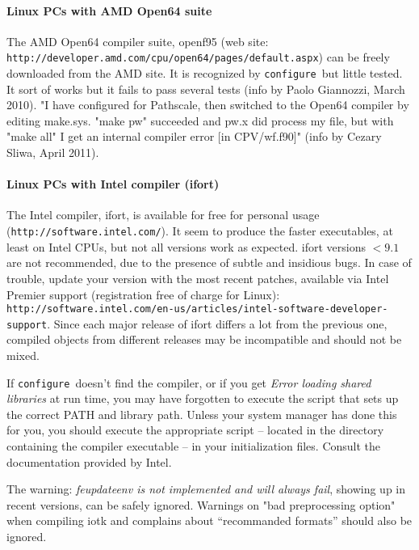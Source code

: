 \documentclass[12pt,a4paper]{article}
\def\configure{\texttt{configure}}
\begin{document}
\paragraph{Linux PCs with AMD Open64 suite}

The AMD Open64 compiler suite, openf95 (web site:
\texttt{http://developer.amd.com/cpu/open64/pages/default.aspx})
can be freely downloaded from the AMD site.
It is recognized by \configure\ but little tested. It sort of works 
but it fails to pass several tests (info by Paolo Giannozzi, March 2010).
"I have configured for Pathscale, then switched to the Open64 compiler by 
editing make.sys. "make pw" succeeded and pw.x did process my file, but with 
"make all" I get an internal compiler error [in CPV/wf.f90]" (info by Cezary 
Sliwa, April 2011).

\paragraph{Linux PCs with Intel compiler (ifort)}

The Intel compiler, ifort, is available for free for personal 
usage (\texttt{http://software.intel.com/}). It seem to produce the faster executables, 
at least on Intel CPUs, but not all versions work as expected.
ifort versions $<9.1$ are not recommended, due to the presence of subtle 
and insidious bugs. In case of trouble, update your version with 
the most recent patches,
available via Intel Premier support (registration free of charge for Linux):
\texttt{http://software.intel.com/en-us/articles/intel-software-developer-support}.
Since each major release of ifort
differs a lot from the previous one, compiled objects from different 
releases may be incompatible and should not be mixed.    

If \configure\ doesn't find the compiler, or if you get 
{\em Error loading shared libraries} at run time, you may have 
forgotten to execute the script that
sets up the correct PATH and library path. Unless your system manager has
done this for you, you should execute the appropriate script -- located in
the directory containing the compiler executable -- in your
initialization files. Consult the documentation provided by Intel. 
    
The warning: {\em feupdateenv is not implemented and will always fail}, 
showing up in recent versions, can be safely ignored. Warnings on
"bad preprocessing option" when compiling iotk
and complains about ``recommanded formats''
should also be ignored.
\end{document}
